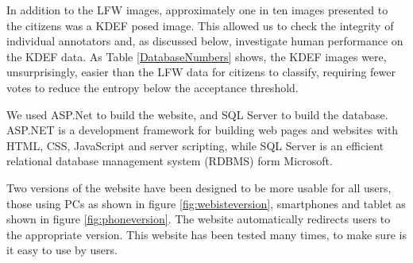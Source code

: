  In addition to the LFW images, approximately one in ten images presented to the citizens was a KDEF posed image. This allowed us to check the integrity of individual annotators and, as discussed below, investigate human performance on the KDEF data.  As Table \ref{DatabaseNumbers} shows, the KDEF images were, unsurprisingly, easier than the LFW data for citizens to classify, requiring fewer votes to reduce the entropy below the acceptance threshold.
 
%



We used ASP.Net to build the website, and SQL Server to build the database. ASP.NET is a development framework for building web pages and websites with HTML, CSS, JavaScript and server scripting, while SQL Server is an efficient relational database management system (RDBMS) form Microsoft. 


Two versions of the website have been designed to be more usable for all users, those using PCs as shown in figure \ref{fig:webisteversion}, smartphones and tablet as shown in figure \ref{fig:phoneversion}. The website automatically redirects users to the appropriate version. This website has been tested many times, to make sure is it easy to use by users. 

